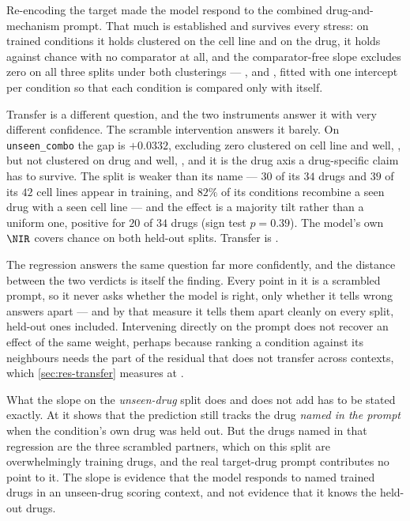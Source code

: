 %
\begin{claim}
  Re-encoding the target made the model respond to the combined drug-and-mechanism
  prompt. That much is established and survives every stress: on trained conditions
  it holds clustered on the cell line and on the drug, it holds against chance with
  no comparator at all, and the comparator-free slope excludes zero on all three
  splits under both clusterings --- ,
   and , fitted with one
  intercept per condition so that each condition is compared only with itself.
  
  Transfer is a different question, and the two instruments answer it with very
  different confidence. The scramble intervention answers it barely. On
  \texttt{unseen\_combo} the gap is $+0.0332$, excluding zero clustered on cell line
  and well, , but not clustered on drug and well,
  , and it is the drug axis a drug-specific claim has
  to survive. The split is weaker than its name --- $30$ of its $34$ drugs and $39$
  of its $42$ cell lines appear in training, and $82\%$ of its conditions recombine
  a seen drug with a seen cell line --- and the effect is a majority tilt rather
  than a uniform one, positive for $20$ of $34$ drugs (sign test $p = 0.39$). The
  model's own $\NIR$ covers chance on both held-out splits. Transfer is
  \notestablished.
  
  The regression answers the same question far more confidently, and the distance
  between the two verdicts is itself the finding. Every point in it is a scrambled
  prompt, so it never asks whether the model is right, only whether it tells wrong
  answers apart --- and by that measure it tells them apart cleanly on every split,
  held-out ones included. Intervening directly on the prompt does not recover an
  effect of the same weight, perhaps because ranking a condition against its neighbours
  needs the part of the residual that does not transfer across contexts, which
  \cref{sec:res-transfer} measures at . 
  
  What the slope on the \emph{unseen-drug} split does and does not add has to be
  stated exactly. At  it shows that the prediction still
  tracks the drug \emph{named in the prompt} when the condition's own drug was held
  out. But the drugs named in that regression are the three scrambled partners,
  which on this split are overwhelmingly training drugs, and the real target-drug
  prompt contributes no point to it. The slope is evidence that the model responds
  to named trained drugs in an unseen-drug scoring context, and not evidence that it
  knows the held-out drugs.
  \end{claim}